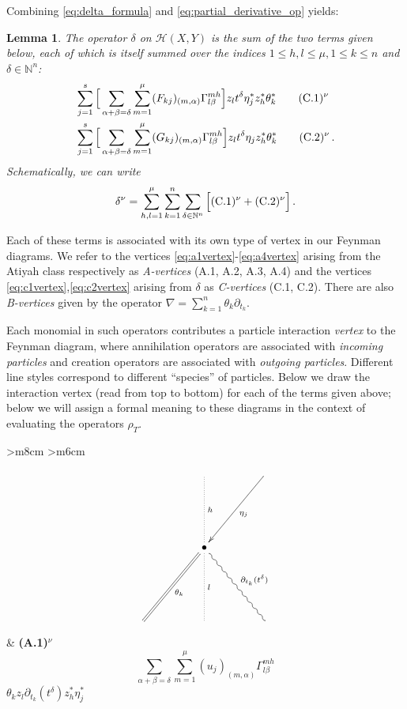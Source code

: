 \documentclass[english,letter paper,12pt,leqno]{article}
\newtheorem{lemma}[theorem]{Lemma}
\theoremstyle{example}
\numberwithin{equation}{section}
\def\HH{\HH}
\def\HH{\mathcal{H}}
\def\be{\begin{equation}}
\def\ee{\end{equation}}
\begin{document}
Combining \eqref{eq:delta_formula} and \eqref{eq:partial_derivative_op} yields:

\begin{lemma}
The operator $\delta$ on $\HH(X,Y)$ is the sum of the two terms given below, each of which is itself summed over the indices $1 \le h,l \le \mu, 1 \le k \le n$ and $\delta \in \mathbb{N}^n$:
\begin{align}
& \sum_{j=1}^s \Big[ \sum_{\alpha + \beta = \delta } \sum_{m=1}^\mu (F_{kj})_{(m,\alpha)} \Gamma^{m h}_{l \beta} \Big] z_{l} t^\delta \eta_j^* z_h^* \theta_k^* \qquad (\textup{C}.1)^{\nu}\label{eq:c1vertex}\\
& \sum_{j=1}^s \Big[ \sum_{\alpha + \beta = \delta } \sum_{m=1}^\mu (G_{kj})_{(m,\alpha)} \Gamma^{m h}_{l \beta} \Big] z_{l} t^\delta \eta_j z_h^* \theta_k^* \qquad (\textup{C}.2)^{\nu}\,.\label{eq:c2vertex}
\end{align}
Schematically, we can write
\be
\delta^\nu = \sum_{h,l=1}^\mu \sum_{k=1}^n\sum_{\delta \in \mathbb{N}^n} \Big[ (\textup{C}.1)^{\nu} + (\textup{C}.2)^{\nu} \Big]\,.
\ee
\end{lemma}

Each of these terms is associated with its own type of vertex in our Feynman diagrams. We refer to the vertices \eqref{eq:a1vertex}-\eqref{eq:a4vertex} arising from the Atiyah class respectively as \emph{A-vertices} (A.1, A.2, A.3, A.4) and the vertices \eqref{eq:c1vertex},\eqref{eq:c2vertex} arising from $\delta$ as \emph{C-vertices} (C.1, C.2). There are also \emph{B-vertices} given by the operator $\nabla = \sum_{k=1}^n \theta_k \partial_{t_k}$.

Each monomial in such operators contributes a particle interaction \emph{vertex} to the Feynman diagram, where annihilation operators are associated with \emph{incoming particles} and creation operators are associated with \emph{outgoing particles}. Different line styles correspond to different ``species'' of particles. Below we draw the interaction vertex (read from top to bottom) for each of the terms given above; below we will assign a formal meaning to these diagrams in the context of evaluating the operators $\rho_T$.

\begin{center}
\begin{tabular}{ >{\centering}m{8cm} >{\centering}m{6cm} }
\[
\xymatrix@C+2pc@R+3pc{
& \ar@{.}[d]^-{h} & \ar[dl]^-{\eta_j}\\
& \bullet \ar@{=}[dl]^-{\theta_k} \ar@{.}[d]^-{l} \ar@{~}[dr]^-{\partial_{t_k}(t^\delta)}\\
& &
}
\]
&
\textbf{(A.1)${}^\nu$}
\vspace{1cm}
\[\sum_{\alpha + \beta = \delta } \sum_{m=1}^\mu (u_j)_{(m,\alpha)} \Gamma^{m h}_{l \beta}\]
\vspace{0.5cm}
$\theta_k z_{l} \partial_{t_k}(t^\delta) z_h^* \eta_j^*$
\end{tabular}
\end{center}
\end{document}
